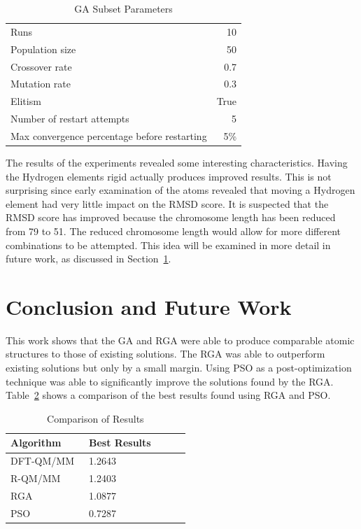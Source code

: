 \documentclass[conference]{IEEEtran}
\begin{document}
\begin{table}
\caption{GA Subset Parameters}
\label{table:subsetParameters}
\centering
\normalsize
\begin{tabular}{ l r }
  \hline
    Runs & 10 \\
    Population size & 50 \\
    Crossover rate & 0.7 \\
    Mutation rate & 0.3 \\
    Elitism & True \\
    Number of restart attempts & 5 \\
    Max convergence percentage before restarting & 5\% \\
  \hline
\end{tabular}
\end{table}

The results of the experiments revealed some interesting characteristics. Having the Hydrogen elements rigid actually produces improved results. This is not surprising since early examination of the atoms revealed that moving a Hydrogen element had very little impact on the RMSD score. It is suspected that the RMSD score has improved because the chromosome length has been reduced from 79 to 51. The reduced chromosome length would allow for more different combinations to be attempted. This idea will be examined in more detail in future work, as discussed in Section~\ref{sec:conclusion}.

\section{Conclusion and Future Work}
\label{sec:conclusion}

This work shows that the GA and RGA were able to produce comparable atomic structures to those of existing solutions. The RGA was able to outperform existing solutions but only by a small margin. Using PSO as a post-optimization technique was able to significantly improve the solutions found by the RGA. Table~\ref{table:resultsComparison} shows a comparison of the best results found using RGA and PSO.

\begin{table}
\caption{Comparison of Results}
\label{table:resultsComparison}
\centering
\normalsize
\begin{tabular}{ | l | l | l | l | l | }
  \hline
    Algorithm & Best Results \\ \hline
    DFT-QM/MM~\cite{luber2011s1} & 1.2643 \\ \hline
    R-QM/MM~\cite{luber2011s1} & 1.2403 \\ \hline
    RGA & 1.0877 \\ \hline
    PSO & 0.7287 \\ \hline
\end{tabular}
\end{table}
\end{document}
